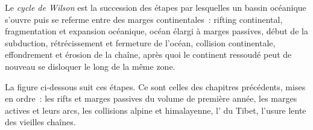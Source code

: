 \begin{definition}\label{def:b2:wilson-cycle:wilson}
Le \emph{cycle de Wilson} est la succession des étapes par lesquelles un bassin océanique
s'ouvre puis se referme entre des marges continentales~: rifting continental, fragmentation et
expansion océanique, océan élargi à marges passives, début de la
subduction, rétrécissement et fermeture de l'océan, collision continentale, effondrement
et érosion de la chaîne, après quoi le continent ressoudé peut de nouveau se disloquer le long de la même zone.
\end{definition}

La figure ci-dessous suit ces étapes. Ce sont celles des chapitres précédents, mises en ordre~:
les rifts et marges passives du volume de première année, les marges actives et leurs arcs, les
collisions alpine et himalayenne, l' du Tibet, l'usure lente
des vieilles chaînes.

